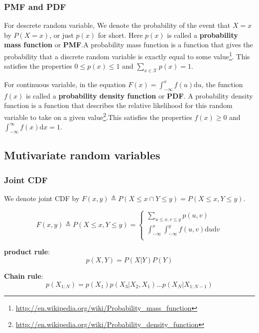 \subsubsection{PMF and PDF}
For descrete random variable, We denote the probability of the event that $X=x$ by $P(X=x)$, or just $p(x)$ for short. Here $p(x)$ is called a \textbf{probability mass function} or \textbf{PMF}.A probability mass function is a function that gives the probability that a discrete random variable is exactly equal to some value\footnote{\url{http://en.wikipedia.org/wiki/Probability_mass_function}}. This satisfies the properties $0 \leq p(x) \leq 1$ and $\sum_{x \in \mathcal{X}} p(x)=1$.

For continuous variable, in the equation $F(x)=\int_{-\infty}^{x} f(u)\mathrm{d}u$, the function $f(x)$ is called a \textbf{probability density function} or \textbf{PDF}. A probability density function is a function that describes the relative likelihood for this random variable to take on a given value\footnote{\url{http://en.wikipedia.org/wiki/Probability_density_function}}.This satisfies the properties $f(x) \geq 0$ and $\int_{-\infty}^{\infty} f(x)\mathrm{d}x=1$.


\subsection{Mutivariate random variables}


\subsubsection{Joint CDF}
We denote joint CDF by $F(x,y) \triangleq P(X \leq x \cap Y \leq y)=P(X \leq x , Y \leq y)$.

\begin{equation}
F(x,y) \triangleq P(X \leq x, Y \leq y)=\begin{cases}
\sum_{u \leq x, v \leq y}p(u,v) \\
\int_{-\infty}^{x}\int_{-\infty}^{y} f(u,v)\mathrm{d}u\mathrm{d}v \\
\end{cases}
\end{equation}

\textbf{product rule}:
\begin{equation}\label{eqn:product-rule}
p(X,Y)=P(X|Y)P(Y)
\end{equation}

\textbf{Chain rule}:
\begin{equation}
p(X_{1:N})=p(X_1)p(X_3|X_2,X_1)...p(X_N|X_{1:N-1})
\end{equation}


